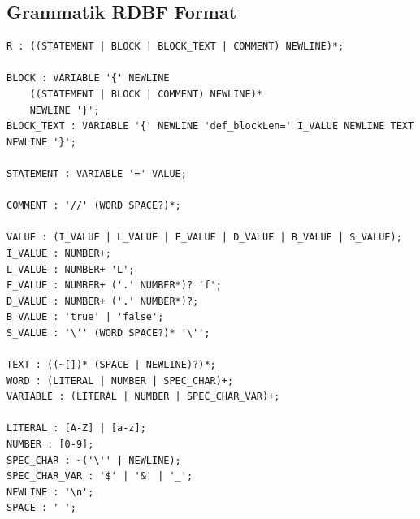 \documentclass[parskip=full]{scrartcl}
\begin{document}
\subsection{Grammatik RDBF Format}
\begin{verbatim}
R : ((STATEMENT | BLOCK | BLOCK_TEXT | COMMENT) NEWLINE)*;

BLOCK : VARIABLE '{' NEWLINE
	((STATEMENT | BLOCK | COMMENT) NEWLINE)*
	NEWLINE '}';
BLOCK_TEXT : VARIABLE '{' NEWLINE 'def_blockLen=' I_VALUE NEWLINE TEXT NEWLINE '}';
	
STATEMENT : VARIABLE '=' VALUE;

COMMENT : '//' (WORD SPACE?)*;

VALUE : (I_VALUE | L_VALUE | F_VALUE | D_VALUE | B_VALUE | S_VALUE);
I_VALUE : NUMBER+;
L_VALUE : NUMBER+ 'L';
F_VALUE : NUMBER+ ('.' NUMBER*)? 'f';
D_VALUE : NUMBER+ ('.' NUMBER*)?;
B_VALUE : 'true' | 'false';
S_VALUE : '\'' (WORD SPACE?)* '\'';

TEXT : ((~[])* (SPACE | NEWLINE)?)*;
WORD : (LITERAL | NUMBER | SPEC_CHAR)+;
VARIABLE : (LITERAL | NUMBER | SPEC_CHAR_VAR)+;

LITERAL : [A-Z] | [a-z];
NUMBER : [0-9];
SPEC_CHAR : ~('\'' | NEWLINE);
SPEC_CHAR_VAR : '$' | '&' | '_';
NEWLINE : '\n';
SPACE : ' ';
\end{verbatim}
\end{document}
